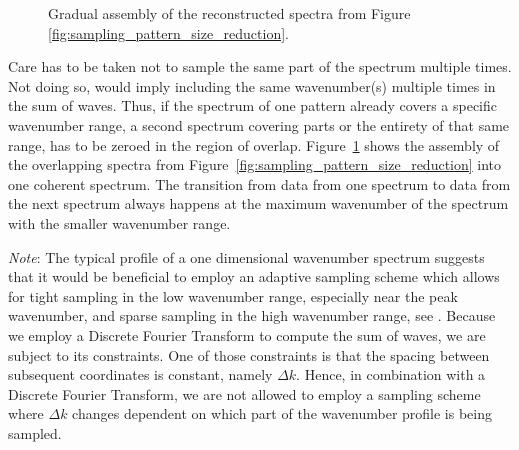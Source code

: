 \begin{figure}
\caption{Gradual assembly of the reconstructed spectra from Figure
\ref{fig:sampling_pattern_size_reduction}.}
\label{fig:sampling_pattern_assembly}
\end{figure}
%
Care has to be taken not to sample the same part of the spectrum multiple times.
Not doing so, would imply including the same wavenumber(s) multiple times in the
sum of waves. Thus, if the spectrum of one pattern already covers a specific
wavenumber range, a second spectrum covering parts or the entirety of that same
range, has to be zeroed in the region of overlap.
Figure~\ref{fig:sampling_pattern_assembly} shows the assembly of the overlapping
spectra from Figure~\ref{fig:sampling_pattern_size_reduction} into one coherent
spectrum. The transition from data from one spectrum to data from the next
spectrum always happens at the maximum wavenumber of the spectrum with the
smaller wavenumber range.

\emph{Note}: The typical profile of a one dimensional wavenumber spectrum suggests
that it would be beneficial to employ an adaptive sampling scheme which allows
for tight sampling in the low wavenumber range, especially near the peak
wavenumber, and sparse sampling in the high wavenumber range, see
\citet{article:frechot2007}. Because we employ a Discrete Fourier
Transform to compute the sum of waves, we are subject to its constraints. One of
those constraints is that the spacing between subsequent coordinates is constant,
namely $\Delta k$. Hence, in combination with a Discrete Fourier Transform, we
are not allowed to employ a sampling scheme where $\Delta k$ changes dependent
on which part of the wavenumber profile is being sampled.


